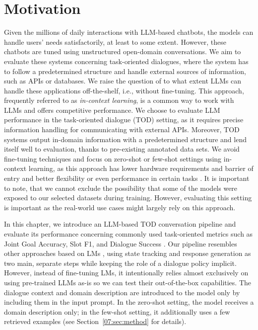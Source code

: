 \section{Motivation}
Given the millions of daily interactions with LLM-based chatbots, the models can handle users' needs satisfactorily, at least to some extent.
However, these chatbots are tuned using unstructured open-domain conversations.
We aim to evaluate these systems concerning task-oriented dialogues, where the system has to follow a predetermined structure and handle external sources of information, such as APIs or databases.
We raise the question of to what extent LLMs can handle these applications off-the-shelf, i.e., without fine-tuning.
This approach, frequently referred to as \emph{in-context learning}, is a common way to work with LLMs and offers competitive performance.
We choose to evaluate LLM performance in the task-oriented dialogue (TOD) setting,
as it requires precise information handling for communicating with external APIs.
Moreover, TOD systems output in-domain information with a predetermined structure and lend itself well to evaluation, thanks to pre-existing annotated data sets.
We avoid fine-tuning techniques and focus on zero-shot or few-shot settings using in-context learning, as this approach has lower hardware requirements and barrier of entry and better flexibility or even performance in certain tasks \cite{su2022selective}.
It is important to note, that we cannot exclude the possibility that some of the models were exposed to our selected datasets during training.
However, evaluating this setting is important as the real-world use cases might largely rely on this approach.

In this chapter, we introduce an LLM-based TOD conversation pipeline and evaluate its performance concerning commonly used task-oriented metrics such as Joint Goal Accuracy, Slot F1, and Dialogue Success \cite{rastogi_multi-task_2018,budzianowski_multiwoz_2018}.
Our pipeline resembles other approaches based on LMs \cite{peng-etal-2021-soloist,yang2021ubar}, using state tracking and response generation as two main, separate steps while keeping the role of a dialogue policy implicit.
However, instead of fine-tuning LMs, it intentionally relies almost exclusively on using pre-trained LLMs as-is so we can test their out-of-the-box capabilities.
The dialogue context and domain description are introduced to the model only by including them in the input prompt.
In the zero-shot setting, the model receives a domain description only; in the few-shot setting, it additionally uses a few retrieved examples (see Section~\ref{07:sec:method} for details).

